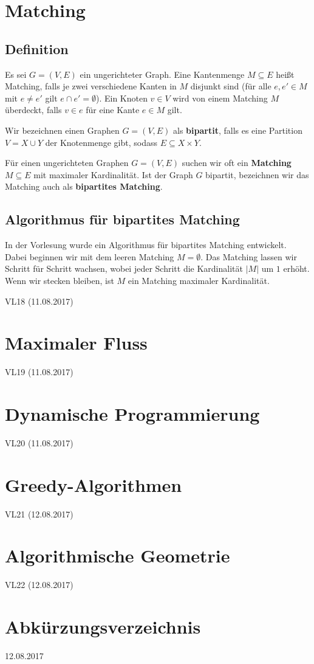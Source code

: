 \documentclass[12pt]{article}
\begin{document}
\section{Matching}

\subsection{Definition}

Es sei $G = (V, E)$ ein ungerichteter Graph. Eine Kantenmenge $M \subseteq E$ heißt Matching, falls je zwei verschiedene Kanten in $M$ disjunkt sind (für alle $e, e' \in M$ mit $e \neq e'$ gilt $e \cap e' = \emptyset$). Ein Knoten $v \in V$ wird von einem Matching $M$ überdeckt, falls $v \in e$ für eine Kante $e \in M$ gilt.

Wir bezeichnen einen Graphen $G = (V, E)$ als \textbf{bipartit}, falls es eine Partition $V = X \cup Y$ der Knotenmenge gibt, sodass $E \subseteq X \times Y$.

Für einen ungerichteten Graphen $G = (V, E)$ suchen wir oft ein \textbf{Matching} $M \subseteq E$ mit maximaler Kardinalität. Ist der Graph $G$ bipartit, bezeichnen wir das Matching auch als \textbf{bipartites Matching}.

\subsection{Algorithmus für bipartites Matching}

In der Vorlesung wurde ein Algorithmus für bipartites Matching entwickelt. Dabei beginnen wir mit dem leeren Matching $M = \emptyset$. Das Matching lassen wir Schritt für Schritt wachsen, wobei jeder Schritt die Kardinalität $|M|$ um $1$ erhöht. Wenn wir stecken bleiben, ist $M$ ein Matching maximaler Kardinalität.

VL18 (11.08.2017)

\section{Maximaler Fluss}

VL19 (11.08.2017)

\section{Dynamische Programmierung}

VL20 (11.08.2017)

\section{Greedy-Algorithmen}

VL21 (12.08.2017)

\section{Algorithmische Geometrie}

VL22 (12.08.2017)

\section{Abkürzungsverzeichnis}

12.08.2017
\end{document}
